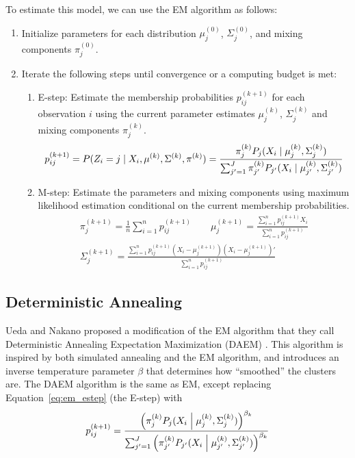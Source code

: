 \documentclass{article}
\newcommand*{\cond}{\;\ifnum\currentgrouptype=16 \middle\fi|\;}
\theoremstyle{definition}
\theoremstyle{algodesc}
\begin{document}
To estimate this model, we can use the EM algorithm as follows:
\begin{enumerate}
\item Initialize parameters for each distribution $\mu_j^{(0)}$, $\Sigma_j^{(0)}$, and mixing components $\pi_j^{(0)}$.
\item Iterate the following steps until convergence or a computing budget is met:
  \begin{enumerate}
  \item E-step: Estimate the membership probabilities $p_{ij}^{(k+1)}$ for each observation $i$ using the current parameter estimates $\mu_j^{(k)}$, $\Sigma_j^{(k)}$ and mixing components $\pi_j^{(k)}$.
    \begin{equation} \label{eq:em_estep}
    p_{ij}^{(k+1)} = P(Z_i = j \cond X_i, \mu^{(k)}, \Sigma^{(k)}, \pi^{(k)})
      = \frac{\pi_j^{(k)} P_j(X_i \cond \mu_j^{(k)}, \Sigma_j^{(k)})}{\sum_{j'=1}^J \pi_{j'}^{(k)} P_{j'}(X_i \cond \mu_{j'}^{(k)}, \Sigma_{j'}^{(k)})}
    \end{equation}
  \item M-step: Estimate the parameters and mixing components using maximum likelihood estimation conditional on the current membership probabilities.
    \begin{equation} \label{eq:em_mstep}
    \begin{gathered}
    \pi_j^{(k+1)} = \frac{1}{n} \sum_{i=1}^n p_{ij}^{(k+1)} \qquad
    \mu_j^{(k+1)} = \frac{\sum_{i=1}^n p_{ij}^{(k+1)} X_i}{\sum_{i=1}^n p_{ij}^{(k+1)}} \\
    \Sigma_j^{(k+1)} = \frac{\sum_{i=1}^n p_{ij}^{(k+1)} (X_i - \mu_j^{(k+1)}) (X_i - \mu_j^{(k+1)})'}{\sum_{i=1}^n p_{ij}^{(k+1)}}
    \end{gathered}
    \end{equation}
  \end{enumerate}
\end{enumerate}


\subsection{Deterministic Annealing}

Ueda and Nakano proposed a modification of the EM algorithm that they call Deterministic Annealing Expectation Maximization (DAEM) \cite{uedanakano98}. This algorithm is inspired by both simulated annealing and the EM algorithm, and introduces an inverse temperature parameter $\beta$ that determines how ``smoothed'' the clusters are. The DAEM algorithm is the same as EM, except replacing Equation~\ref{eq:em_estep} (the E-step) with
  \begin{equation} \label{eq:da_estep}
  p_{ij}^{(k+1)}
    = \frac{\left( \pi_j^{(k)} P_j(X_i \cond \mu_j^{(k)}, \Sigma_j^{(k)}) \right)^{\beta_k}}{\sum_{j'=1}^J \left( \pi_{j'}^{(k)} P_{j'}(X_i \cond \mu_{j'}^{(k)}, \Sigma_{j'}^{(k)}) \right)^{\beta_k}}
  \end{equation}
\end{document}

